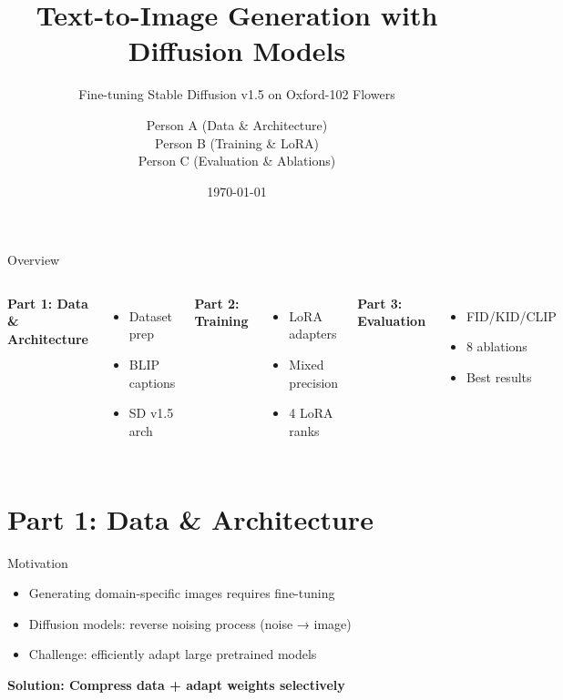 \documentclass{beamer}
\title{Text-to-Image Generation with Diffusion Models}
\subtitle{Fine-tuning Stable Diffusion v1.5 on Oxford-102 Flowers}
\author{Person A (Data \& Architecture) \\ Person B (Training \& LoRA) \\ Person C (Evaluation \& Ablations)}
\date{\today}
\institute{Indiana University}
\begin{document}
\begin{frame}
\titlepage
\end{frame}

\begin{frame}{Overview}
\begin{columns}[T]
\textbf{Part 1: Data \& Architecture}
\begin{itemize}
    \item Dataset prep
    \item BLIP captions
    \item SD v1.5 arch
\end{itemize}

\textbf{Part 2: Training}
\begin{itemize}
    \item LoRA adapters
    \item Mixed precision
    \item 4 LoRA ranks
\end{itemize}

\textbf{Part 3: Evaluation}
\begin{itemize}
    \item FID/KID/CLIP
    \item 8 ablations
    \item Best results
\end{itemize}
\end{columns}
\end{frame}

\section{Part 1: Data \& Architecture}

\begin{frame}{Motivation}
\begin{itemize}
    \item Generating domain-specific images requires fine-tuning
    \item Diffusion models: reverse noising process (noise → image)
    \item Challenge: efficiently adapt large pretrained models
\end{itemize}
\vspace{1cm}
\begin{center}
\textbf{Solution: Compress data + adapt weights selectively}
\end{center}
\end{frame}
\end{document}
